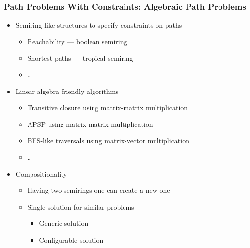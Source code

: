 \documentclass[xcolor=table,aspectratio=169]{beamer}
\begin{document}
\begin{frame}[fragile]
  \frametitle{Path Problems With Constraints: Algebraic Path Problems}  
    \begin{itemize}
      \item Semiring-like structures to specify constraints on paths
      \begin{itemize}
        \item Reachability --- boolean semiring
        \item Shortest paths --- tropical semiring
        \item \ldots
      \end{itemize}
      \pause
      \item Linear algebra friendly algorithms 
      \begin{itemize}
        \item Transitive closure using matrix-matrix multiplication
        \item APSP using matrix-matrix multiplication
        \item BFS-like traversals using matrix-vector multiplication
        \item \ldots
      \end{itemize}
      \pause
      \item Compositionality
      \begin{itemize}
        \item Having two semirings one can create a new one
        \item Single solution for similar problems
        \begin{itemize}
          \item Generic solution
          \item Configurable solution
        \end{itemize}
      \end{itemize}
    \end{itemize}     
\end{frame}
\end{document}

